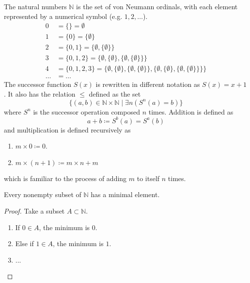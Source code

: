 \documentclass{article}
\begin{document}
    \begin{definition}
      The natural numbers $\mathbb{N}$ is the set of von Neumann ordinals, with each element represented by a numerical symbol (e.g. $1, 2, \ldots$). 
      \begin{align*}
        0 & = \{\} = \emptyset \\
        1 & = \{0\} = \{\emptyset\} \\
        2 & = \{0,1\} = \{\emptyset,\{\emptyset\}\} \\
        3 & = \{0,1,2\} = \{\emptyset,\{\emptyset\},\{\emptyset,\{\emptyset\}\}\} \\
        4 & = \{0,1,2,3\} = \{\emptyset,\{\emptyset\},\{\emptyset,\{\emptyset\}\},\{\emptyset,\{\emptyset\},\{\emptyset,\{\emptyset\}\}\}\} \\
        \ldots & = \ldots 
      \end{align*} 
      The successor function $S(x)$ is rewritten in different notation as $S(x) = x + 1$. It also has the relation $\leq$ defined as the set
      \begin{equation}
        \{ (a, b) \in \mathbb{N} \times \mathbb{N} \mid \exists n (S^n(a) = b )\}
      \end{equation}
      where $S^n$ is the successor operation composed $n$ times. Addition is defined as 
      \begin{equation}
        a + b \coloneqq S^b (a) = S^a (b)
      \end{equation}
      and multiplication is defined recursively as 
      \begin{enumerate}
        \item $m \times 0 \coloneqq 0$. 
        \item $m \times (n + 1) \coloneqq m \times n + m$
      \end{enumerate}
      which is familiar to the process of adding $m$ to itself $n$ times. 
    \end{definition}

    \begin{lemma}
      Every nonempty subset of $\mathbb{N}$ has a minimal element. 
    \end{lemma} 
    \begin{proof}
      Take a subset $A \subset \mathbb{N}$. 
      \begin{enumerate}
        \item If $0 \in A$, the minimum is $0$. 
        \item Else if $1 \in A$, the minimum is $1$. 
        \item ...
      \end{enumerate} 
    \end{proof}
\end{document}
